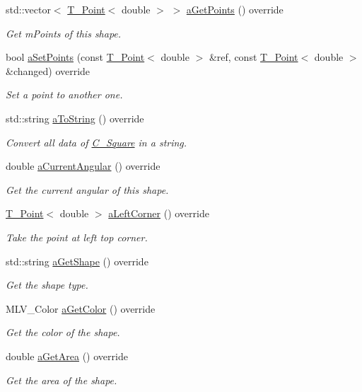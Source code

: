 \begin{DoxyCompactItemize}
std\+::vector$<$ \hyperlink{classT__Point}{T\+\_\+\+Point}$<$ double $>$ $>$ \hyperlink{classC__Square_abd62f2e94839c64b6222667b8eabbfc0}{a\+Get\+Points} () override
\begin{DoxyCompactList}\small\item\em Get m\+Points of this shape. \end{DoxyCompactList}\item 
bool \hyperlink{classC__Square_a295a170686422b745587a250ebe08a5e}{a\+Set\+Points} (const \hyperlink{classT__Point}{T\+\_\+\+Point}$<$ double $>$ \&ref, const \hyperlink{classT__Point}{T\+\_\+\+Point}$<$ double $>$ \&changed) override
\begin{DoxyCompactList}\small\item\em Set a point to another one. \end{DoxyCompactList}\item 
std\+::string \hyperlink{classC__Square_ab2cada51b25cd35b9a79e461767e56f0}{a\+To\+String} () override
\begin{DoxyCompactList}\small\item\em Convert all data of \hyperlink{classC__Square}{C\+\_\+\+Square} in a string. \end{DoxyCompactList}\item 
double \hyperlink{classC__Square_ac7779503b305fda4147b735622c66f81}{a\+Current\+Angular} () override
\begin{DoxyCompactList}\small\item\em Get the current angular of this shape. \end{DoxyCompactList}\item 
\hyperlink{classT__Point}{T\+\_\+\+Point}$<$ double $>$ \hyperlink{classC__Square_acc99fea573bbbcc6ab231bc2c6d713f4}{a\+Left\+Corner} () override
\begin{DoxyCompactList}\small\item\em Take the point at left top corner. \end{DoxyCompactList}\item 
std\+::string \hyperlink{classC__Square_a4919017d3750c1b8deb5f07d22069636}{a\+Get\+Shape} () override
\begin{DoxyCompactList}\small\item\em Get the shape type. \end{DoxyCompactList}\item 
M\+L\+V\+\_\+\+Color \hyperlink{classC__Square_a44b1e58b20cc98edc774a73742fec9a7}{a\+Get\+Color} () override
\begin{DoxyCompactList}\small\item\em Get the color of the shape. \end{DoxyCompactList}\item 
double \hyperlink{classC__Square_affd2be59872618d5d1955be360fb73e6}{a\+Get\+Area} () override
\begin{DoxyCompactList}\small\item\em Get the area of the shape. \end{DoxyCompactList}\end{DoxyCompactItemize}
